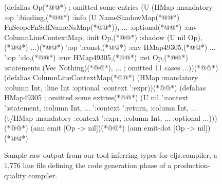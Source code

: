 \begin{figure}
\begin{cljlistingnumbered}
  (defalias Op(*@\label{infer:listing:cljs:Op}@*) ; omitted some entries
    (U (HMap :mandatory
             {:op ':binding,(*@\label{infer:listing:cljs:Op:op:binding}@*)
              :info (U NameShadowMap(*@\label{infer:listing:cljs:Op:op:binding:NameShadowMap}@*)
                       FnScopeFnSelfNameNsMap(*@\label{infer:listing:cljs:Op:op:binding:FnScopeFnSelfNameNsMap}@*)), ...}
             :optional(*@\label{infer:listing:cljs:Op:optional}@*)
             {:env ColumnLineContextMap, :init Op,(*@\label{infer:listing:cljs:Op:optional:init:Op}@*)
              :shadow (U nil Op),(*@\label{infer:listing:cljs:Op:optional:shadow:Op}@*) ...})(*@\label{infer:listing:cljs:Op:optionalEnd}@*)
      '{:op ':const,(*@\label{infer:listing:cljs:Op:op:const}@*) :env HMap49305,(*@\label{infer:listing:cljs:Op:op:const:HMap49305}@*) ...}
      '{:op ':do,(*@\label{infer:listing:cljs:Op:op:do}@*) :env HMap49305,(*@\label{infer:listing:cljs:Op:op:do:HMap49305}@*)
        :ret Op,(*@\label{infer:listing:cljs:Op:op:do:Op}@*) :statements (Vec Nothing)(*@\label{infer:listing:cljs:Op:op:do:statements}@*), ...}
      ; omitted 11 cases
      ...))(*@\label{infer:listing:cljs:Op-End}@*)
  (defalias ColumnLineContextMap(*@\label{infer:listing:cljs:ColumnLineContextMap}@*)
    (HMap :mandatory {:column Int, :line Int}
          :optional {:context ':expr}))(*@\label{infer:listing:cljs:ColumnLineContextMapEnd}@*)
  (defalias HMap49305 ; omitted some extries(*@\label{infer:listing:cljs:HMap49305}@*)
    (U nil
       '{:context ':statement, :column Int, ...}
       '{:context ':return, :column Int, ...}
       (t/HMap :mandatory
               {:context ':expr, :column Int, ...}
               :optional {...})))(*@\label{infer:listing:cljs:HMap49305End}@*)
  (ann emit [Op -> nil])(*@\label{infer:listing:cljs:emit}@*)
  (ann emit-dot [Op -> nil])(*@\label{infer:listing:cljs:emit-dot}@*)
\end{cljlistingnumbered}
\caption{
         Sample raw output from our
         tool inferring types for cljs.compiler,
         a 1,776 line file defining the code generation phase of
         a production-quality compiler.
}
\end{figure}
